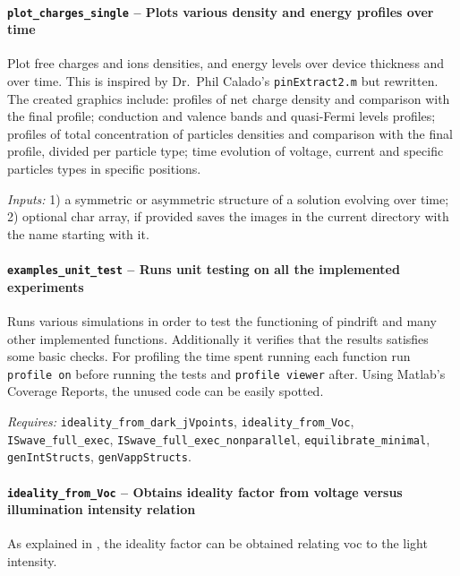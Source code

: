 		\paragraph{\texttt{plot\_charges\_single} -- Plots various density and energy profiles over time}
Plot free charges and ions densities, and energy levels over device thickness and over time.
 This is inspired by Dr.\ Phil Calado's \texttt{pinExtract2.m} but rewritten.
 The created graphics include: profiles of net charge density and 
 comparison with the final profile; conduction and valence bands and 
 quasi-Fermi levels profiles; profiles of total concentration of 
 particles densities and comparison with the final profile, divided 
 per particle type; time evolution of voltage, current and specific 
 particles types in specific positions.

		\textit{Inputs:} 1) a symmetric or asymmetric structure of a solution evolving over time;
		2) optional char array, if provided saves the images in the current directory with the name starting with it.

		\paragraph{\texttt{examples\_unit\_test} -- Runs unit testing on all the implemented experiments}
Runs various simulations in order to test the functioning of pindrift and many other implemented functions.
Additionally it verifies that the results satisfies some basic checks.
 For profiling the time spent running each function run \texttt{profile on} before running the tests and \texttt{profile viewer} after.
 Using Matlab's Coverage Reports, the unused code can be easily spotted.

\textit{Requires:} \texttt{ideality\_from\_dark\_jVpoints}, \texttt{ideality\_from\_Voc}, \texttt{ISwave\_full\_exec}, \texttt{ISwave\_full\_exec\_nonparallel}, \texttt{equilibrate\_minimal}, \texttt{gen\-Int\-Structs}, \texttt{gen\-Vapp\-Structs}.

			\paragraph{\texttt{ideality\_from\_Voc} -- Obtains ideality factor from voltage versus illumination intensity relation}\label{dd_ideality}
	As explained in , the ideality factor can be obtained relating \gls{voc} to the light intensity.
	
